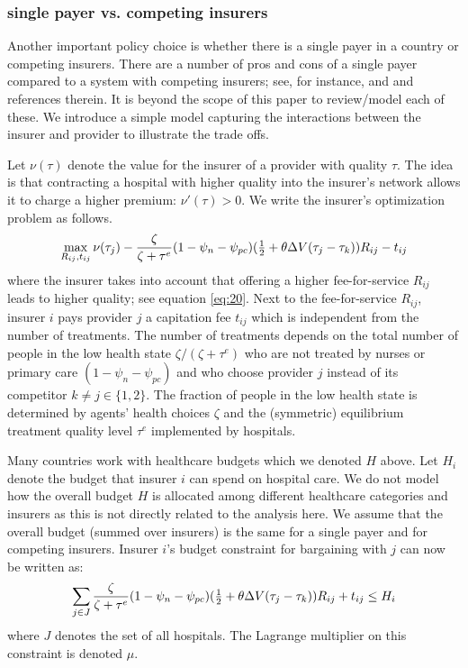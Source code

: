 \documentclass[a4paper,12pt]{article}
\begin{document}
\subsubsection{single payer vs. competing insurers}
\label{sec:org68e9921}

Another important policy choice is whether there is a single payer in a country or competing insurers. There are a number of pros and cons of a single payer compared to a system with competing insurers; see, for instance, \cite{OberlanderSinglePayer} and \cite{BICHAY2020113454} and references therein. It is beyond the scope of this paper to review/model each of these. We introduce a simple model capturing the interactions between the insurer and provider to illustrate the trade offs.

Let \(\nu(\tau)\) denote the value for the insurer of a provider with quality \(\tau\). The idea is that contracting a hospital with higher quality into the insurer's network allows it to charge a higher premium: \(\nu'(\tau) > 0\). We write the insurer's optimization problem as follows.
\begin{equation}
\label{eq:36a}
\max_{R_{ij},t_{ij}} \nu(\tau_j) - \frac{\zeta}{\zeta+\tau^e}(1-\psi_n-\psi_{pc}) (\textstyle{1\over 2}+\theta\Delta V(\tau_j-\tau_k) )R_{ij} - t_{ij}
\end{equation}
where the insurer takes into account that offering a higher fee-for-service \(R_{ij}\) leads to higher quality; see equation \eqref{eq:20}. Next to the fee-for-service \(R_{ij}\), insurer \(i\) pays provider \(j\) a capitation fee \(t_{ij}\) which is independent from the number of treatments. The number of treatments depends on the total number of people in the low health state \(\zeta/(\zeta+\tau^e)\) who are not treated by nurses or primary care \((1-\psi_n-\psi_{pc})\) and who choose provider \(j\) instead of its competitor \(k \neq j \in \{1,2\}\). The fraction of people in the low health state is determined by agents' health choices \(\zeta\) and the (symmetric) equilibrium treatment quality level \(\tau^e\) implemented by hospitals.

Many countries work with healthcare budgets which we denoted \(H\) above. Let \(H_i\) denote the budget that insurer \(i\) can spend on hospital care. We do not model how the overall budget \(H\) is allocated among different healthcare categories and insurers as this is not directly related to the analysis here. We assume that the overall budget (summed over insurers) is the same for a single payer and for competing insurers. Insurer \(i\)'s budget constraint for bargaining with \(j\) can now be written as:
\begin{equation}
\label{eq:35}
\sum_{j \in J} \frac{\zeta}{\zeta+\tau^e}(1-\psi_n-\psi_{pc}) (\textstyle{1\over 2}+\theta\Delta V(\tau_j-\tau_k) )R_{ij} + t_{ij} \leq H_i
\end{equation}
where \(J\) denotes the set of all hospitals. The Lagrange multiplier on this constraint is denoted \(\mu\).
\end{document}
